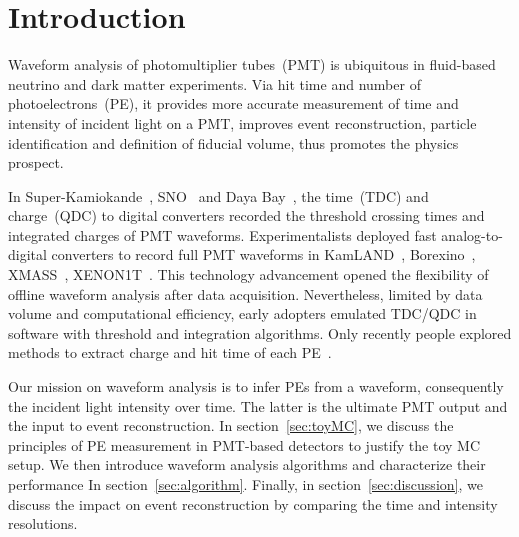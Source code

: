 \section{Introduction}
\label{sec:introduction}

Waveform analysis of photomultiplier tubes~(PMT) is ubiquitous in fluid-based neutrino and dark matter experiments.  Via hit time and number of photoelectrons~(PE), it provides more accurate measurement of time and intensity of incident light on a PMT, improves event reconstruction, particle identification and definition of fiducial volume, thus promotes the physics prospect.

In Super-Kamiokande~\cite{noauthor_super-kamiokande_2003}, SNO~\cite{dunger_event_2019} and Daya Bay~\cite{daya_bay_collaboration_measurement_2017}, the time~(TDC) and charge~(QDC) to digital converters recorded the threshold crossing times and integrated charges of PMT waveforms.  Experimentalists deployed fast analog-to-digital converters to record full PMT waveforms in KamLAND~\cite{kamland_collaboration_production_2010}, Borexino~\cite{alimonti_borexino_2009}, XMASS~\cite{abe_xmass_2013}, XENON1T~\cite{xenon_collaboration_xenon1t_2019}.  This technology advancement opened the flexibility of offline waveform analysis after data acquisition.  Nevertheless, limited by data volume and computational efficiency, early adopters emulated TDC/QDC in software with threshold and integration algorithms.  Only recently people explored methods to extract charge and hit time of each PE~\cite{zhang_comparison_2019}.

Our mission on waveform analysis is to infer PEs from a waveform, consequently the incident light intensity over time.  The latter is the ultimate PMT output and the input to event reconstruction.  In section~\ref{sec:toyMC}, we discuss the principles of PE measurement in PMT-based detectors to justify the toy MC setup.  We then introduce waveform analysis algorithms and characterize their performance In section~\ref{sec:algorithm}.  Finally, in section~\ref{sec:discussion}, we discuss the impact on event reconstruction by comparing the time and intensity resolutions.
